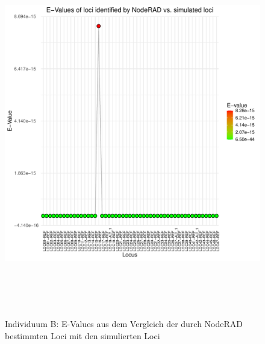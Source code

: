\begin{figure}[H]
	\begin{center}
		\includegraphics[height=16cm]{bilder/evaluation/evalues/B.plot_evalues.pdf}
		\caption{Individuum B: E-Values aus dem Vergleich der durch NodeRAD bestimmten Loci mit den simulierten Loci}
	\end{center}
\end{figure}

